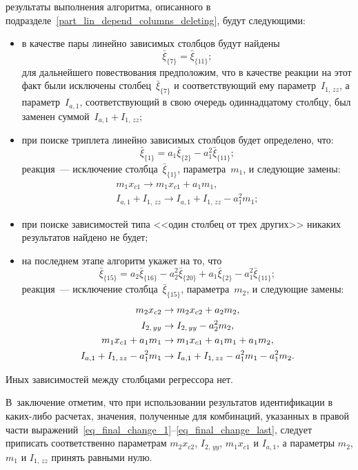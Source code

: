 результаты выполнения алгоритма, описанного в подразделе~\ref{part_lin_depend_columns_deleting}, будут следующими:
\begin{itemize}
    \item в качестве пары линейно зависимых столбцов будут найдены
    \begin{equation}
        \bar{\xi}_{\{7\}} = \bar{\xi}_{\{11\}};
    \end{equation}
    для дальнейшего повествования предположим, что в качестве реакции на этот факт были исключены столбец~$\bar{\xi}_{\{7\}}$ и соответствующий ему параметр~$I_{1,\,zz}$, а параметр~$I_{a,1}$, соответствующий в свою очередь одиннадцатому столбцу, был заменен суммой~$I_{a,1} + I_{1,\,zz}$;
    \item при поиске триплета линейно зависимых столбцов будет определено, что:
    \begin{equation}
        \bar{\xi}_{\{1\}} = a_1 \bar{\xi}_{\{2\}} - a_1^2 \bar{\xi}_{\{11\}};
    \end{equation}
    реакция~--- исключение столбца~$\bar{\xi}_{\{1\}}$, параметра~$m_1$, и следующие замены:
    \begin{gather}
        m_1 x_{c1} \rightarrow m_1 x_{c1} + a_1 m_1, \\
        I_{a,1} + I_{1,\,zz} \rightarrow I_{a,1} + I_{1,\,zz} - a_1^2 m_1;
    \end{gather}
    \item при поиске зависимостей типа <<один столбец от трех других>> никаких результатов найдено не будет;
    \item на последнем этапе алгоритм укажет на то, что
    \begin{equation}
        \bar{\xi}_{\{15\}} = a_2 \bar{\xi}_{\{16\}} - a_2^2 \bar{\xi}_{\{20\}} + a_1 \bar{\xi}_{\{2\}} - a_1^2 \bar{\xi}_{\{11\}};
    \end{equation}
    реакция~--- исключение столбца~$\bar{\xi}_{\{15\}}$, параметра~$m_2$, и следующие замены:
    \begin{gather}
        m_2 x_{c2} \rightarrow m_2 x_{c2} + a_2 m_2, \label{eq_final_change_1}\\
        I_{2,\,yy} \rightarrow I_{2,\,yy} - a_2^2 m_2, \\
        m_1 x_{c1} + a_1 m_1 \rightarrow m_1 x_{c1} + a_1 m_1 + a_1 m_2, \\
        I_{a,1} + I_{1,\,zz} - a_1^2 m_1 \rightarrow I_{a,1} + I_{1,\,zz} - a_1^2 m_1 - a_1^2 m_2 \ldotp \label{eq_final_change_last}
    \end{gather}
\end{itemize}
Иных зависимостей между столбцами регрессора нет.

В~заключение отметим, что при использовании результатов идентификации в каких-либо расчетах, значения, полученные для комбинаций, указанных в правой части выражений~\eqref{eq_final_change_1}--\eqref{eq_final_change_last}, следует приписать соответственно параметрам $m_2 x_{c2}$, $I_{2,\,yy}$, $m_1 x_{c1}$ и $I_{a,1}$, а параметры $m_2$, $m_1$ и $I_{1,\,zz}$ принять равными нулю.
